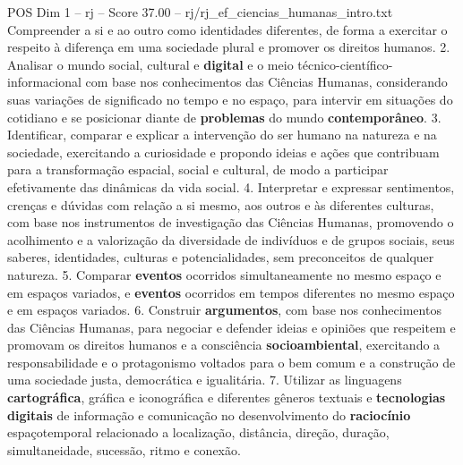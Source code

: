 \begin{textsample}{POS Dim 1 – rj – Score 37.00 – rj/rj\_ef\_ciencias\_humanas\_intro.txt}
Compreender a si e ao outro como identidades diferentes, de forma a exercitar o respeito à diferença em uma sociedade plural e promover os direitos humanos. 2.
Analisar o mundo social, cultural e \textbf{digital} e o meio técnico-científico-informacional com base nos conhecimentos das Ciências Humanas, considerando suas variações de significado no tempo e no espaço, para intervir em situações do cotidiano e se posicionar diante de \textbf{problemas} do mundo \textbf{contemporâneo}. 3.
Identificar, comparar e explicar a intervenção do ser humano na natureza e na sociedade, exercitando a curiosidade e propondo ideias e ações que contribuam para a transformação espacial, social e cultural, de modo a participar efetivamente das dinâmicas da vida social. 4.
Interpretar e expressar sentimentos, crenças e dúvidas com relação a si mesmo, aos outros e às diferentes culturas, com base nos instrumentos de investigação das Ciências Humanas, promovendo o acolhimento e a valorização da diversidade de indivíduos e de grupos sociais, seus saberes, identidades, culturas e potencialidades, sem preconceitos de qualquer natureza. 5.
Comparar \textbf{eventos} ocorridos simultaneamente no mesmo espaço e em espaços variados, e \textbf{eventos} ocorridos em tempos diferentes no mesmo espaço e em espaços variados. 6.
Construir \textbf{argumentos}, com base nos conhecimentos das Ciências Humanas, para negociar e defender ideias e opiniões que respeitem e promovam os direitos humanos e a consciência \textbf{socioambiental}, exercitando a responsabilidade e o protagonismo voltados para o bem comum e a construção de uma sociedade justa, democrática e igualitária. 7.
Utilizar as linguagens \textbf{cartográfica}, gráfica e iconográfica e diferentes gêneros textuais e \textbf{tecnologias} \textbf{digitais} de informação e comunicação no desenvolvimento do \textbf{raciocínio} espaçotemporal relacionado a localização, distância, direção, duração, simultaneidade, sucessão, ritmo e conexão.

\end{textsample}
